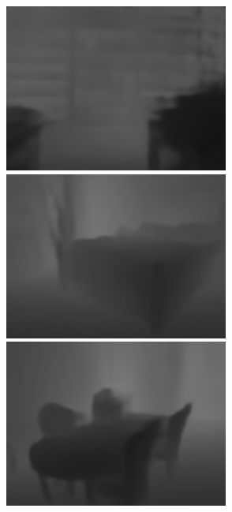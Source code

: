 \begin{figure}[htb]
\begin{subfigure}{0.24\linewidth}
\begin{minipage}[b]{1\linewidth}
  \includegraphics[width=1\linewidth]{figure/Pixel_cla_nyu/3res.jpg}\vspace{4pt}
  \includegraphics[width=1\linewidth]{figure/Pixel_cla_nyu/4res.jpg}\vspace{4pt}
  \includegraphics[width=1\linewidth]{figure/Pixel_cla_nyu/5res.jpg}

\end{minipage}
\end{subfigure}
\end{figure}

